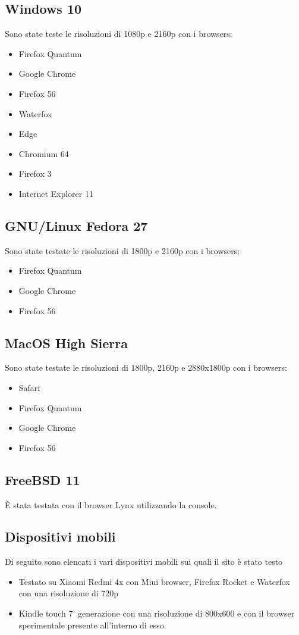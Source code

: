 \documentclass[openany, a4paper, 12pt]{report}
\begin{document}
				\subsection{Windows 10}
				Sono state teste le risoluzioni di 1080p e 2160p con i browsers:
				\begin{itemize}
					\item Firefox Quantum
					\item Google Chrome
					\item Firefox 56
					\item Waterfox
					\item Edge
					\item Chromium 64
					\item Firefox 3
					\item Internet Explorer 11
				\end{itemize}

				\subsection{GNU/Linux Fedora 27}
				Sono state testate le risoluzioni di 1800p e 2160p con i browsers:
				\begin{itemize}
					\item Firefox Quantum
					\item Google Chrome
					\item Firefox 56
				\end{itemize}

				\subsection{MacOS High Sierra}
				Sono state testate le risoluzioni di 1800p, 2160p e 2880x1800p con i browsers:
				\begin{itemize}
					\item Safari
					\item Firefox Quantum
					\item Google Chrome
					\item Firefox 56
				\end{itemize}

				\subsection{FreeBSD 11}
				\`{E} stata testata con il browser Lynx utilizzando la console.

				\subsection{Dispositivi mobili}
				Di seguito sono elencati i vari dispositivi mobili sui quali il sito è stato testo
				\begin{itemize}
				\item Testato su Xiaomi Redmi 4x con Miui browser, Firefox Rocket e Waterfox con una risoluzione di 720p
				\item Kindle touch 7' generazione con una risoluzione di 800x600 e con il browser sperimentale presente all'interno di esso.
				\end{itemize} 
\end{document}
